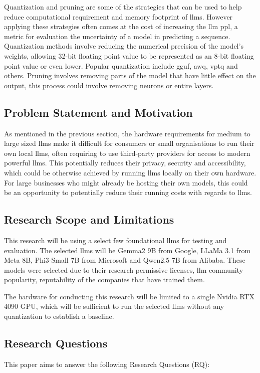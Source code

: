 \documentclass{ifacconf}
\begin{document}
	Quantization and pruning are some of the strategies that can be used to help reduce computational requirement and memory footprint of \glspl{llm}. However applying these strategies often comes at the cost of increasing the \gls{llm} \gls{ppl}, a metric for evaluation the uncertainty of a model in predicting a sequence. Quantization methods involve reducing the numerical precision of the model's weights, allowing 32-bit floating point value to be represented as an 8-bit floating point value or even lower. Popular quantization include \gls{gguf}, \gls{awq}, \gls{vptq} and others. Pruning involves removing parts of the model that have little effect on the output, this process could involve removing neurons or entire layers.
	
	\subsection{Problem Statement and Motivation}
	
	As mentioned in the previous section, the hardware requirements for medium to large sized  \glspl{llm} make it difficult for consumers or small organisations to run their own local  \glspl{llm}, often requiring to use third-party providers for access to modern powerful  \glspl{llm}. This potentially reduces their privacy, security and accessibility, which could be otherwise achieved by running  \glspl{llm} locally on their own hardware. For large businesses who might already be hosting their own models, this could be an opportunity to potentially reduce their running costs with regards to \glspl{llm}.
	
	\subsection{Research Scope and Limitations}
	This research will be using a select few foundational \glspl{llm} for testing and evaluation. The selected \glspl{llm} will be Gemma2 9B from Google, LLaMa 3.1 from Meta 8B, Phi3-Small 7B from Microsoft and Qwen2.5 7B from Alibaba. These models were selected due to their research permissive licenses, \gls{llm} community popularity, reputability of the companies that have trained them.
	
	The hardware for conducting this research will be limited to a single Nvidia RTX 4090 GPU, which will be sufficient to run the selected \glspl{llm} without any quantization to establish a baseline.
	
	\subsection{Research Questions}
	This paper aims to answer the following Research Questions (RQ):
	
\end{document}
